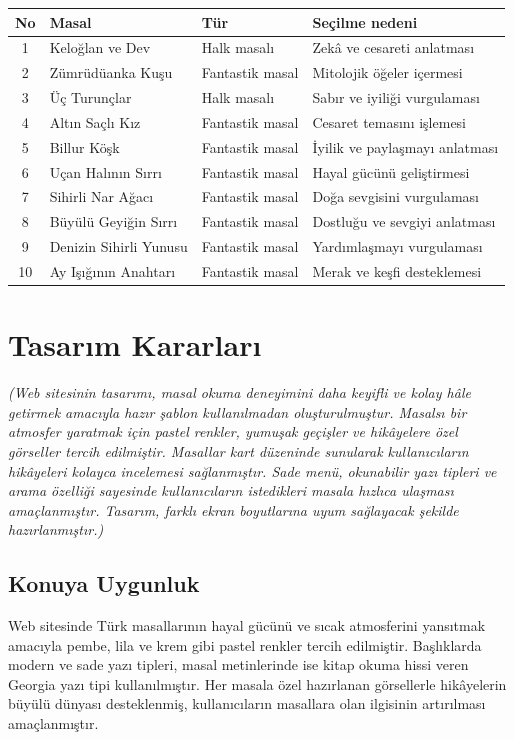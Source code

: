 \documentclass[12pt,a4paper]{article}
\newcommand{\aciklama}[1]{{\color{gray}\itshape (#1)}}
\begin{document}
\begin{longtable}{@{}cp{4cm}p{3cm}p{5.4cm}@{}}
\toprule
\textbf{No} & \textbf{Masal} & \textbf{Tür} & \textbf{Seçilme nedeni} \\
\midrule
\endhead
1 & Keloğlan ve Dev & Halk masalı & Zekâ ve cesareti anlatması \\
2 & Zümrüdüanka Kuşu & Fantastik masal & Mitolojik öğeler içermesi \\
3 & Üç Turunçlar & Halk masalı & Sabır ve iyiliği vurgulaması \\
4 & Altın Saçlı Kız & Fantastik masal & Cesaret temasını işlemesi \\
5 & Billur Köşk & Fantastik masal & İyilik ve paylaşmayı anlatması \\
6 & Uçan Halının Sırrı & Fantastik masal & Hayal gücünü geliştirmesi \\
7 & Sihirli Nar Ağacı & Fantastik masal & Doğa sevgisini vurgulaması \\
8 & Büyülü Geyiğin Sırrı & Fantastik masal & Dostluğu ve sevgiyi anlatması \\
9 & Denizin Sihirli Yunusu & Fantastik masal & Yardımlaşmayı vurgulaması \\
10 & Ay Işığının Anahtarı & Fantastik masal & Merak ve keşfi desteklemesi \\
\bottomrule
\end{longtable}

\section{Tasarım Kararları}
\aciklama{Web sitesinin tasarımı, masal okuma deneyimini daha keyifli ve kolay hâle getirmek amacıyla hazır şablon kullanılmadan oluşturulmuştur. Masalsı bir atmosfer yaratmak için pastel renkler, yumuşak geçişler ve hikâyelere özel görseller tercih edilmiştir. Masallar kart düzeninde sunularak kullanıcıların hikâyeleri kolayca incelemesi sağlanmıştır. Sade menü, okunabilir yazı tipleri ve arama özelliği sayesinde kullanıcıların istedikleri masala hızlıca ulaşması amaçlanmıştır. Tasarım, farklı ekran boyutlarına uyum sağlayacak şekilde hazırlanmıştır.}

\subsection{Konuya Uygunluk}
Web sitesinde Türk masallarının hayal gücünü ve sıcak atmosferini yansıtmak amacıyla pembe, lila ve krem gibi pastel renkler tercih edilmiştir. Başlıklarda modern ve sade yazı tipleri, masal metinlerinde ise kitap okuma hissi veren Georgia yazı tipi kullanılmıştır. Her masala özel hazırlanan görsellerle hikâyelerin büyülü dünyası desteklenmiş, kullanıcıların masallara olan ilgisinin artırılması amaçlanmıştır.
\end{document}
